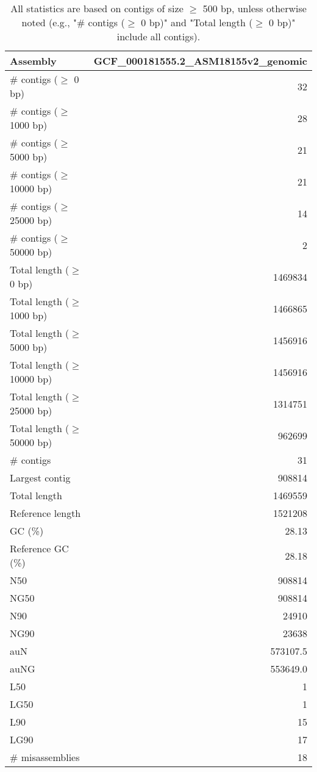 \documentclass[12pt,a4paper]{article}
\begin{document}
\begin{table}[ht]
\begin{center}
\caption{All statistics are based on contigs of size $\geq$ 500 bp, unless otherwise noted (e.g., "\# contigs ($\geq$ 0 bp)" and "Total length ($\geq$ 0 bp)" include all contigs).}
\begin{tabular}{|l*{1}{|r}|}
\hline
Assembly & GCF\_000181555.2\_ASM18155v2\_genomic \\ \hline
\# contigs ($\geq$ 0 bp) & 32 \\ \hline
\# contigs ($\geq$ 1000 bp) & 28 \\ \hline
\# contigs ($\geq$ 5000 bp) & 21 \\ \hline
\# contigs ($\geq$ 10000 bp) & 21 \\ \hline
\# contigs ($\geq$ 25000 bp) & 14 \\ \hline
\# contigs ($\geq$ 50000 bp) & 2 \\ \hline
Total length ($\geq$ 0 bp) & 1469834 \\ \hline
Total length ($\geq$ 1000 bp) & 1466865 \\ \hline
Total length ($\geq$ 5000 bp) & 1456916 \\ \hline
Total length ($\geq$ 10000 bp) & 1456916 \\ \hline
Total length ($\geq$ 25000 bp) & 1314751 \\ \hline
Total length ($\geq$ 50000 bp) & 962699 \\ \hline
\# contigs & 31 \\ \hline
Largest contig & 908814 \\ \hline
Total length & 1469559 \\ \hline
Reference length & 1521208 \\ \hline
GC (\%) & 28.13 \\ \hline
Reference GC (\%) & 28.18 \\ \hline
N50 & 908814 \\ \hline
NG50 & 908814 \\ \hline
N90 & 24910 \\ \hline
NG90 & 23638 \\ \hline
auN & 573107.5 \\ \hline
auNG & 553649.0 \\ \hline
L50 & 1 \\ \hline
LG50 & 1 \\ \hline
L90 & 15 \\ \hline
LG90 & 17 \\ \hline
\# misassemblies & 18 \\ \hline

\end{tabular}
\end{center}
\end{table}
\end{document}
